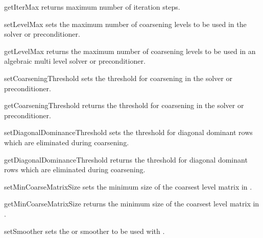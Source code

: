 \begin{methoddesc}[SolverOptions]{getIterMax}{}
returns maximum number of iteration steps.
\end{methoddesc}

\begin{methoddesc}[SolverOptions]{setLevelMax}{}
sets the maximum number of coarsening levels to be used in the \AMG solver or
preconditioner.
\end{methoddesc}

\begin{methoddesc}[SolverOptions]{getLevelMax}{}
returns the maximum number of coarsening levels to be used in an algebraic
multi level solver or preconditioner.
\end{methoddesc}

\begin{methoddesc}[SolverOptions]{setCoarseningThreshold}{}
sets the threshold for coarsening in the \AMG solver or preconditioner.
\end{methoddesc}

\begin{methoddesc}[SolverOptions]{getCoarseningThreshold}{}
returns the threshold for coarsening in the \AMG solver or preconditioner.
\end{methoddesc}

\begin{methoddesc}[SolverOptions]{setDiagonalDominanceThreshold}{}
sets the threshold for diagonal dominant rows which are eliminated during \AMG  coarsening.
\end{methoddesc}

\begin{methoddesc}[SolverOptions]{getDiagonalDominanceThreshold}{}
returns the threshold for diagonal dominant rows which are eliminated during \AMG  coarsening.
\end{methoddesc}

\begin{methoddesc}[SolverOptions]{setMinCoarseMatrixSize}{}
sets the minimum size of the coarsest level matrix in \AMG.
\end{methoddesc}

\begin{methoddesc}[SolverOptions]{getMinCoarseMatrixSize}{}
returns the minimum size of the coarsest level matrix in \AMG.
\end{methoddesc}

\begin{methoddesc}[SolverOptions]{setSmoother}{}
sets the \JACOBI or \GAUSSSEIDEL smoother to be used with \AMG.
\end{methoddesc}

